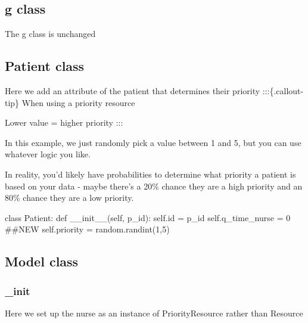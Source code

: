\documentclass[
  letterpaper,
  DIV=11,
  numbers=noendperiod]{scrreprt}
\newenvironment{Shaded}{\begin{snugshade}}{\end{snugshade}}
\newcommand{\BuiltInTok}[1]{\textcolor[rgb]{0.00,0.23,0.31}{#1}}
\newcommand{\CommentTok}[1]{\textcolor[rgb]{0.37,0.37,0.37}{#1}}
\newcommand{\DecValTok}[1]{\textcolor[rgb]{0.68,0.00,0.00}{#1}}
\newcommand{\FunctionTok}[1]{\textcolor[rgb]{0.28,0.35,0.67}{#1}}
\newcommand{\KeywordTok}[1]{\textcolor[rgb]{0.00,0.23,0.31}{#1}}
\newcommand{\NormalTok}[1]{\textcolor[rgb]{0.00,0.23,0.31}{#1}}
\newcommand{\OperatorTok}[1]{\textcolor[rgb]{0.37,0.37,0.37}{#1}}
\newcommand{\VariableTok}[1]{\textcolor[rgb]{0.07,0.07,0.07}{#1}}
\begin{document}
\subsection{g class}\label{g-class-2}

The g class is unchanged

\subsection{Patient class}\label{patient-class}

Here we add an attribute of the patient that determines their priority
:::\{.callout-tip\} When using a priority resource

Lower value = higher priority :::

In this example, we just randomly pick a value between 1 and 5, but you
can use whatever logic you like.

In reality, you'd likely have probabilities to determine what priority a
patient is based on your data - maybe there's a 20\% chance they are a
high priority and an 80\% chance they are a low priority.

\begin{Shaded}
\begin{Highlighting}[]
\KeywordTok{class}\NormalTok{ Patient:}
    \KeywordTok{def} \FunctionTok{\_\_init\_\_}\NormalTok{(}\VariableTok{self}\NormalTok{, p\_id):}
        \VariableTok{self}\NormalTok{.}\BuiltInTok{id} \OperatorTok{=}\NormalTok{ p\_id}
        \VariableTok{self}\NormalTok{.q\_time\_nurse }\OperatorTok{=} \DecValTok{0}
        \CommentTok{\#\#NEW}
        \VariableTok{self}\NormalTok{.priority }\OperatorTok{=}\NormalTok{ random.randint(}\DecValTok{1}\NormalTok{,}\DecValTok{5}\NormalTok{)}
\end{Highlighting}
\end{Shaded}

\subsection{Model class}\label{model-class-2}

\subsubsection{\_init}\label{init}

Here we set up the nurse as an instance of PriorityResource rather than
Resource
\end{document}
